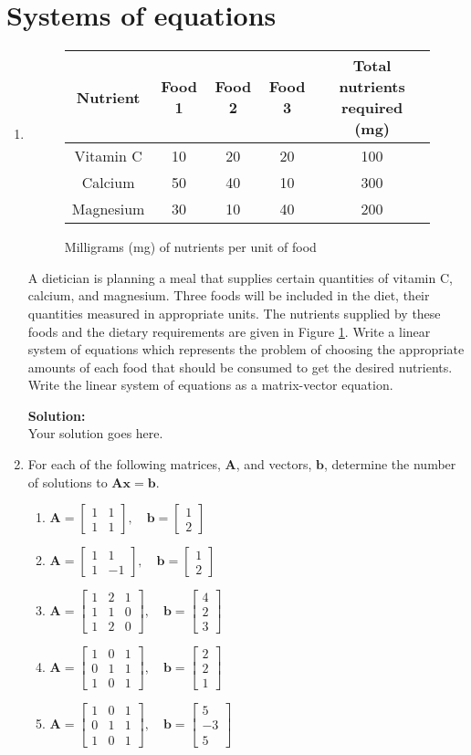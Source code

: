 \documentclass[]{article}
\newcommand{\bbm}{\begin{bmatrix}}		%
\newcommand{\ebm}{\end{bmatrix}}		%
\newcommand{\x}{\bm{x}}					%
\newcommand{\A}{\bm{A}}					%
\newcommand{\solution}{\vskip 0.5cm \textbf{\large Solution:} \\}
\begin{document}
\section*{Systems of equations}
\begin{enumerate}[resume]
	\item \begin{figure}
		\centering
		\begin{tabular}{ccccc}
		Nutrient & Food 1 & Food 2 & Food 3 & Total nutrients required (mg) \\ \hline
		Vitamin C & 10 & 20 & 20 & 100 \\
		Calcium & 50 & 40 & 10 & 300 \\
		Magnesium & 30 & 10 & 40 & 200 \\ \hline
		\end{tabular}
		\caption{Milligrams (mg) of nutrients per unit of food}
		\label{fig:diet}
	\end{figure}

	A dietician is planning a meal that supplies certain quantities of vitamin C, calcium, and magnesium. Three foods will be included in the diet, their quantities measured in appropriate units. The nutrients supplied by these foods and the dietary requirements are given in Figure \ref{fig:diet}. Write a linear system of equations which represents the problem of choosing the appropriate amounts of each food that should be consumed to get the desired nutrients. Write the linear system of equations as a matrix-vector equation.

	\solution
	Your solution goes here.


	\item For each of the following matrices, $\A$, and vectors, $\bm{b}$, determine the number of solutions to $\A\x=\bm{b}$.
	\begin{enumerate}
		\item $\A = \bbm 1&1\\1&1 \ebm,\quad \bm{b}=\bbm 1\\2\ebm$
		\item $\A = \bbm 1&1\\1&-1\ebm,\quad \bm{b}=\bbm 1\\2\ebm$
		\item $\A = \bbm 1 & 2 & 1 \\ 1&1&0\\1&2&0 \ebm,\quad \bm{b}=\bbm 4\\2\\3 \ebm$
		\item $\A = \bbm 1&0&1\\0&1&1\\1&0&1 \ebm,\quad \bm{b}=\bbm 2\\2\\1 \ebm$
		\item $\A = \bbm 1&0&1\\0&1&1\\1&0&1 \ebm,\quad \bm{b}=\bbm 5\\-3\\5 \ebm$
	\end{enumerate}


\end{enumerate}
\end{document}
